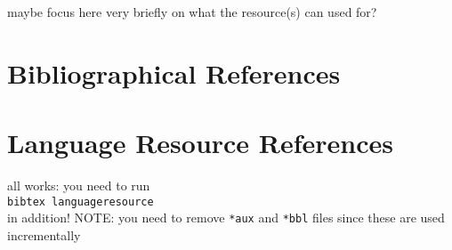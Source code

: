 \documentclass[a4paper,10pt]{article}
\newcommand{\TODO}[1]{\begingroup\color{red}#1\endgroup}
\begin{document}
\TODO{maybe focus here very briefly on what the resource(s) can used for?} 

\section{Bibliographical References}
\label{main:ref}





\section{Language Resource References}
\label{lr:ref}

\TODO{all works: you need to run\\
\texttt{bibtex languageresource}\\
 in addition! NOTE: you need to remove 
\texttt{*aux} and \texttt{*bbl} files since these are used incrementally }

\end{document}
